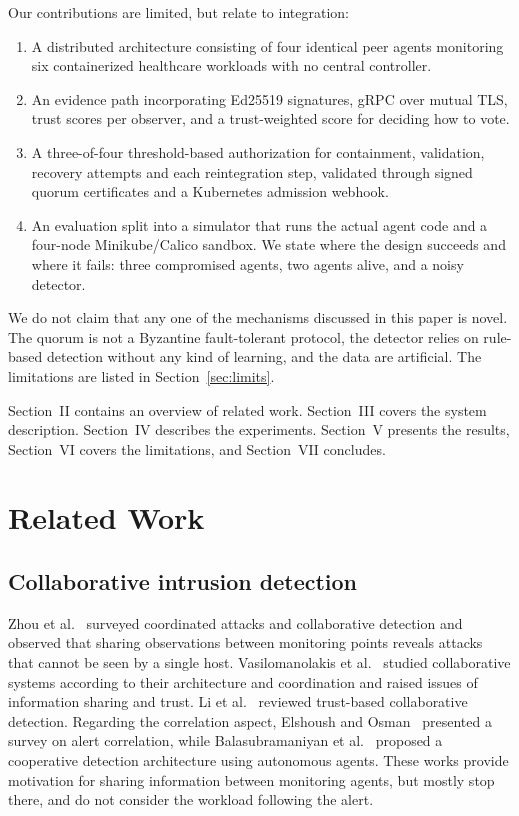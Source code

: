 \documentclass[journal]{IEEEtran}
\begin{document}
Our contributions are limited, but relate to integration:
\begin{enumerate}
\item A distributed architecture consisting of four identical peer agents monitoring six containerized healthcare workloads with no central controller.
\item An evidence path incorporating Ed25519 signatures, gRPC over mutual TLS, trust scores per observer, and a trust-weighted score for deciding how to vote.
\item A three-of-four threshold-based authorization for containment, validation, recovery attempts and each reintegration step, validated through signed quorum certificates and a Kubernetes admission webhook.
\item An evaluation split into a simulator that runs the actual agent code and a four-node Minikube/Calico sandbox. We state where the design succeeds and where it fails: three compromised agents, two agents alive, and a noisy detector.
\end{enumerate}
We do not claim that any one of the mechanisms discussed in this paper is novel. The quorum is not a Byzantine fault-tolerant protocol, the detector relies on rule-based detection without any kind of learning, and the data are artificial. The limitations are listed in Section~\ref{sec:limits}.

Section~II contains an overview of related work. Section~III covers the system description. Section~IV describes the experiments. Section~V presents the results, Section~VI covers the limitations, and Section~VII concludes.

\section{Related Work}
\subsection{Collaborative intrusion detection}
Zhou et al.~\cite{zhou10} surveyed coordinated attacks and collaborative detection and observed that sharing observations between monitoring points reveals attacks that cannot be seen by a single host. Vasilomanolakis et al.~\cite{vasilo15} studied collaborative systems according to their architecture and coordination and raised issues of information sharing and trust. Li et al.~\cite{li22} reviewed trust-based collaborative detection. Regarding the correlation aspect, Elshoush and Osman~\cite{elshoush11} presented a survey on alert correlation, while Balasubramaniyan et al.~\cite{balas98} proposed a cooperative detection architecture using autonomous agents. These works provide motivation for sharing information between monitoring agents, but mostly stop there, and do not consider the workload following the alert.
\end{document}
